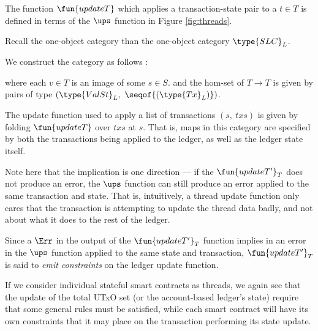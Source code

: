 The function $\fun{updateT}$ which applies a transaction-state pair to a $t \in T$
is defined in terms of the $\ups$ function in Figure \ref{fig:threads}.

Recall the one-object category than the one-object category $\type{SLC}_L$.

We construct the category as follows :



 where each $v \in T$ is an image of some $s \in S$.
  and the hom-set of $T \to T$ is given by pairs of type $(\type{ValSt}_{L},~\seqof{(\type{Tx}_{L})})$.

  The update function used to apply a list of transactions $(s,~txs)$ is given by
  folding $\fun{updateT}$ over $txs$ at $s$.
  That is, maps in this category are specified by both the transactions being applied to the ledger,
  as well as the ledger state itself.



Note here that the implication is one direction --- if the $\fun{updateT'}_T$
does not produce an error, the $\ups$ function can still produce an error applied
to the same transaction and state. That is, intuitively, a thread update function
only cares that the transaction is attempting to
update the thread data badly, and not about what it does to the rest of the ledger.

Since a $\Err$ in the output of the $\fun{updateT'}_T$ function implies in an error
in the $\ups$ function applied to the same state and transaction,
$\fun{updateT'}_T$ is said to \emph{emit constraints} on the ledger update
function.



If we consider individual stateful smart contracts as threads, we again see that
the update of the total UTxO set (or the account-based ledger's state) require
that some general rules must be satisfied, while each smart contract will
have its own constraints that it may place on the transaction performing its
state update.

